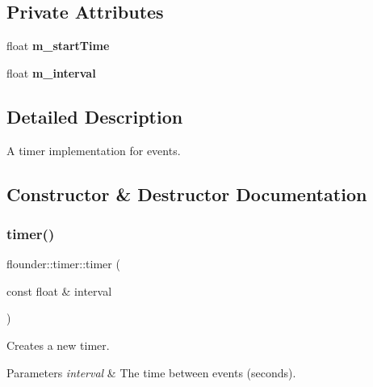 \subsection*{Private Attributes}
\begin{DoxyCompactItemize}
\item 
\mbox{\label{classflounder_1_1timer_ab83bfeb33cb0ae0453211cda77e1c15b}} 
float {\bfseries m\+\_\+start\+Time}
\item 
\mbox{\label{classflounder_1_1timer_a09706bd6d4793030a842dfdf473c16b0}} 
float {\bfseries m\+\_\+interval}
\end{DoxyCompactItemize}


\subsection{Detailed Description}
A timer implementation for events. 



\subsection{Constructor \& Destructor Documentation}
\mbox{\label{classflounder_1_1timer_a3769450a798aa0608494ef65378e096c}} 
\subsubsection{\texorpdfstring{timer()}{timer()}}
{\footnotesize\ttfamily flounder\+::timer\+::timer (\begin{DoxyParamCaption}\item[{const float \&}]{interval }\end{DoxyParamCaption})}



Creates a new timer. 


\begin{DoxyParams}{Parameters}
{\em interval} & The time between events (seconds). \\
\hline
\end{DoxyParams}
\mbox{\label{classflounder_1_1timer_a2644c550b3bb6aa1c757287a72ff9179}} 
